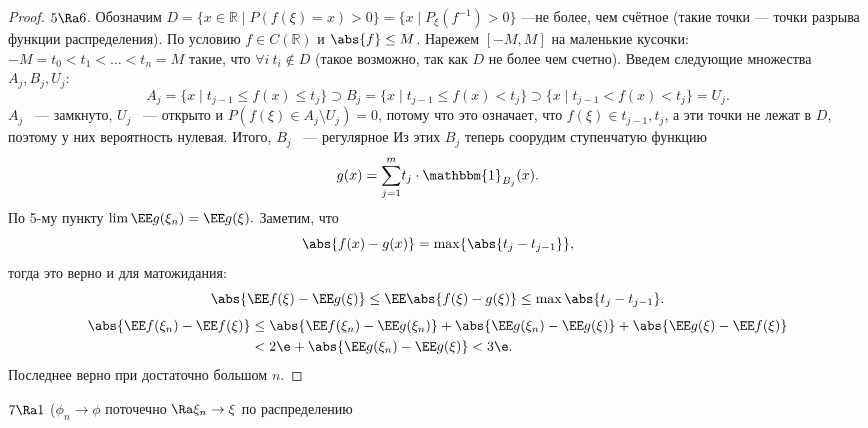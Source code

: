 \begin{proof}
     $5\Ra 6$. Обозначим $D = \{x\in\mathbb{R}\mid P(f(\xi) = x) > 0\} = \{x\mid P_\xi(f^{-1}) > 0\}$ ---не более, чем счётное (такие точки --- точки разрыва функции распределения).
    По условию $f\in C(\mathbb{R})$ и $\abs{f}\le M$. Нарежем $[-M, M]$ на маленькие кусочки: $-M = t_0 < t_1 < \ldots < t_n = M$ такие, что $\forall i \ t_i \notin D$ (такое возможно, так как $D$ не более чем счетно).
     Введем следующие множества $A_j, B_j, U_j$:
     $$A_j = \{x\mid t_{j - 1}\le f(x) \le t_j\}\supset B_j = \{x\mid t_{j - 1}\le f(x) < t_j\} \supset \{x\mid t_{j - 1}< f(x) < t_j\} =  U _j.$$
     $A_j$ ~--- замкнуто, $ U _j$ ~--- открыто и $P(f(\xi)\in A_j\setminus  U _j) = 0$, потому что это означает, что $f(\xi)\in {t_{j - 1}, t_j}$, а эти точки не лежат в $D$, поэтому у них вероятность нулевая. Итого, $B_j$ ~--- регулярное
     Из этих $B_j$ теперь соорудим ступенчатую функцию 
     $$g(x)= \overset{m}{\underset{j = 1}{\sum}} t_j\cdot\mathbbm{1}_{B_j}(x).$$
    По 5-му пункту $\lim \EE g(\xi_n) = \EE g(\xi).$
    Заметим, что
       $$ \abs{f(x) - g(x)} = \max\{\abs{t_j - t_{j - 1}}\}, $$
       тогда это верно и для матожидания:
       $$\abs{\EE f(\xi) - \EE g(\xi)}\le \EE \abs{f(\xi) - g(\xi)}\le \max \abs{t_j - t_{j - 1}}.$$
        \begin{align*}
        \abs{\EE f(\xi_n) - \EE f(\xi)} &\le \abs{\EE f(\xi_n) - \EE g(\xi_n)} + \abs{\EE g(\xi_n) - \EE g(\xi)} + \abs{\EE g(\xi) - \EE f(\xi)} \\&< 2 \e + \abs{\EE g(\xi_n) - \EE g(\xi)} < 3 \e.
    \end{align*}
     Последнее верно при достаточно большом $n$. 
 \end{proof}
 
 \begin{theorem}
     $7 \Ra 1$ ($\phi_n \to \phi$ поточечно $\Ra \xi_n \to \xi$ по распределению
 \end{theorem}
 

